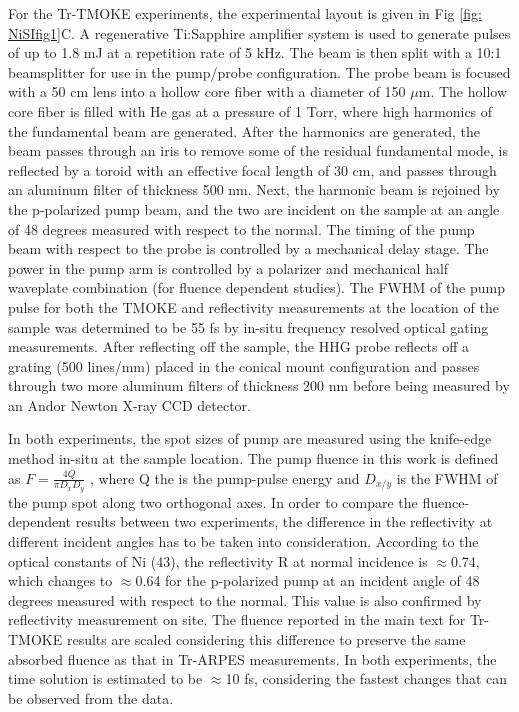 For the Tr-TMOKE experiments, the experimental layout is given in Fig \ref{fig: NiSIfig1}C. A regenerative Ti:Sapphire amplifier system is used to generate pulses of up to 1.8 mJ at a repetition rate of 5 kHz. The beam is then split with a 10:1 beamsplitter for use in the pump/probe configuration. The probe beam is focused with a 50 cm lens into a hollow core fiber with a diameter of 150 $\mu$m. The hollow core fiber is filled with He gas at a pressure of 1 Torr, where high harmonics of the fundamental beam are generated. After the harmonics are generated, the beam passes through an iris to remove some of the residual fundamental mode, is reflected by a toroid with an effective focal length of 30 cm, and passes through an aluminum filter of thickness 500 nm. Next, the harmonic beam is rejoined by the p-polarized pump beam, and the two are incident on the sample at an angle of 48 degrees measured with respect to the normal. The timing of the pump beam with respect to the probe is controlled by a mechanical delay stage. The power in the pump arm is controlled by a polarizer and mechanical half waveplate combination (for fluence dependent studies). The FWHM of the pump pulse for both the TMOKE and reflectivity measurements at the location of the sample was determined to be 55 fs by in-situ frequency resolved optical gating measurements. After reflecting off the sample, the HHG probe reflects off a grating (500 lines/mm) placed in the conical mount configuration and passes through two more aluminum filters of thickness 200 nm before being measured by an Andor Newton X-ray CCD detector.

In both experiments, the spot sizes of pump are measured using the knife-edge method in-situ at the sample location. The pump fluence in this work is defined as $F=\frac{4Q}{\pi D_x D_y}$ , where Q the is the pump-pulse energy and $D_{x/y}$ is the FWHM of the pump spot along two orthogonal axes. In order to compare the fluence-dependent results between two experiments, the difference in the reflectivity at different incident angles has to be taken into consideration. According to the optical constants of Ni (43), the reflectivity R at normal incidence is $\approx$0.74, which changes to $\approx$0.64 for the p-polarized pump at an incident angle of 48 degrees measured with respect to the normal. This value is also confirmed by reflectivity measurement on site. The fluence reported in the main text for Tr-TMOKE results are scaled considering this difference to preserve the same absorbed fluence as that in Tr-ARPES measurements. In both experiments, the time solution is estimated to be $\approx$10 fs, considering the fastest changes that can be observed from the data.

